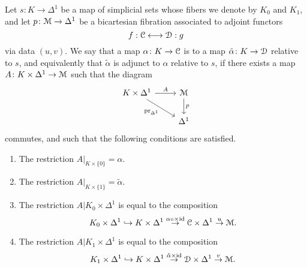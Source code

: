 \documentclass[main.tex]{subfiles}
\begin{document}
\begin{definition}
  \label{def:adjunct_data}
  Let $s\colon K \to \Delta^{1}$ be a map of simplicial sets whose fibers we denote by $K_{0}$ and $K_{1}$, and let $p\colon \mathcal{M} \to \Delta^{1}$ be a bicartesian fibration associated to adjoint functors
  \begin{equation*}
    f : \mathcal{C} \longleftrightarrow \mathcal{D} : g
  \end{equation*}
  via data $(u, v)$. We say that a map $\alpha\colon K \to \mathcal{C}$ is  to a map $\tilde{\alpha}\colon K \to \mathcal{D}$ relative to $s$, and equivalently that $\tilde{\alpha}$ is adjunct to $\alpha$ relative to $s$, if there exists a map $A\colon K \times \Delta^{1} \to \mathcal{M}$ such that the diagram
  \begin{equation*}
    \begin{tikzcd}
      K \times \Delta^{1}
      \arrow[r, "A"]
      \arrow[dr, swap, "\pr_{\Delta^{1}}"]
      & \category{M}
      \arrow[d, "p"]
      \\
      & \Delta^{1}
    \end{tikzcd}
  \end{equation*}
  commutes, and such that the following conditions are satisfied.
  \begin{enumerate}
    \item The restriction $A|_{K \times \{0\}} = \alpha$.

    \item The restriction $A|_{K \times \{1\}} = \tilde{\alpha}$.

    \item The restriction $A|K_{0} \times \Delta^{1}$ is equal to the composition
      \begin{equation*}
        K_{0} \times \Delta^{1} \hookrightarrow K \times \Delta^{1} \overset{\alpha \circ \times \mathrm{id}}{\to} \mathcal{C} \times \Delta^{1} \overset{u}{\to} \mathcal{M}.
      \end{equation*}

    \item The restriction $A|K_{1} \times \Delta^{1}$ is equal to the composition
      \begin{equation*}
        K_{1} \times \Delta^{1} \hookrightarrow K \times \Delta^{1} \overset{\tilde{\alpha} \times \mathrm{id}}{\to} \mathcal{D} \times \Delta^{1} \overset{v}{\to} \mathcal{M}.
      \end{equation*}
  \end{enumerate}
\end{definition}
\end{document}
